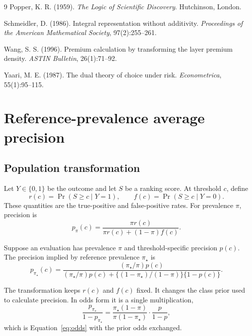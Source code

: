 \documentclass[11pt]{article}
\theoremstyle{remark}
\begin{document}
\begin{thebibliography}{9}
Popper, K. R. (1959).
\emph{The Logic of Scientific Discovery}.
Hutchinson, London.

Schmeidler, D. (1986).
Integral representation without additivity.
\emph{Proceedings of the American Mathematical Society}, 97(2):255--261.

Wang, S. S. (1996).
Premium calculation by transforming the layer premium density.
\emph{ASTIN Bulletin}, 26(1):71--92.

Yaari, M. E. (1987).
The dual theory of choice under risk.
\emph{Econometrica}, 55(1):95--115.

\end{thebibliography}


\newpage
\appendix

\section{Reference-prevalence average precision}
\label{app:prevalence}

\subsection{Population transformation}

Let $Y\in\{0,1\}$ be the outcome and let $S$ be a ranking score. At threshold $c$, define
\[
r(c)=\Pr(S\geq c\mid Y=1),
\qquad
f(c)=\Pr(S\geq c\mid Y=0).
\]
These quantities are the true-positive and false-positive rates. For prevalence $\pi$, precision is
\[
p_{\pi}(c)
=
\frac{\pi r(c)}{\pi r(c)+(1-\pi)f(c)}.
\]

Suppose an evaluation has prevalence $\pi$ and threshold-specific precision $p(c)$. The precision implied by reference prevalence $\pi_\star$ is
\begin{equation}
p_{\pi_\star}(c)
=
\frac{(\pi_\star/\pi)p(c)}
{(\pi_\star/\pi)p(c)
+
\{(1-\pi_\star)/(1-\pi)\}\{1-p(c)\}}.
\label{eq:precision-transform}
\end{equation}

The transformation keeps $r(c)$ and $f(c)$ fixed. It changes the class prior used to calculate precision. In odds form it is a single multiplication,
\[
\frac{p_{\pi_\star}}{1-p_{\pi_\star}}
=
\frac{\pi_\star(1-\pi)}{\pi(1-\pi_\star)}
\cdot
\frac{p}{1-p},
\]
which is Equation~\eqref{eq:odds} with the prior odds exchanged.
\end{document}
